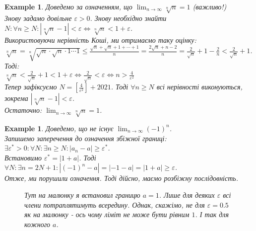\documentclass[a4paper, 14pt]{article}
\theoremstyle{theoremdd}
\theoremstyle{theoremdd}
\theoremstyle{theoremdd}
\theoremstyle{theoremdd}
\newtheorem{example}[theorem]{Example}
\theoremstyle{theoremdd}
\theoremstyle{theoremdd}
\theoremstyle{theoremdd}
\theoremstyle{theoremdd}
\begin{document}
	\begin{example}
	Доведемо за означенням, що $\displaystyle\lim_{n \to \infty} \sqrt[n]{n}=1$ (важливо!)\\
	Знову задамо довільне $\varepsilon > 0$. Знову необхідно знайти $\displaystyle N: \forall n \geq N: \left|\sqrt[n]{n}-1  \right|<\varepsilon \iff \sqrt[n]{n}<1+\varepsilon$.\\
	Використовуючи нерівність Коші, ми отримаємо таку оцінку:\\
	$\displaystyle \sqrt[n]{n}= \sqrt[n]{\sqrt{n}\cdot\sqrt{n}\cdot 1 \cdots 1} \leq \frac{\sqrt{n}+\sqrt{n}+1+\cdots+1}{n} = \frac{2\sqrt{n}+n-2}{n} = \frac{2}{\sqrt{n}}+1-\frac{2}{n}<\frac{2}{\sqrt{n}}+1$. Тоді:\\
	$\displaystyle \sqrt[n]{n} < \frac{2}{\sqrt{n}} + 1 < 1 + \varepsilon \iff \frac{2}{\sqrt{n}} < \varepsilon \iff n > \frac{4}{\varepsilon^2}$\\
	Тепер зафіксуємо $\displaystyle N = \left[\frac{4}{\varepsilon^2} \right] + 2021$. Тоді $\forall n \geq N$ всі нерівності виконуються, зокрема $\left|\sqrt[n]{n}-1  \right|<\varepsilon$.\\
	Остаточно: $\displaystyle\lim_{n \to \infty} \sqrt[n]{n}=1$.
	\end{example}
	
	\begin{example}
	Доведемо, що не існує $\displaystyle \lim_{n \to \infty} (-1)^n$.\\
	Запишемо заперечення до означення збіжної границі:\\
	$\exists \varepsilon^* > 0: \forall N: \exists n \geq N: |a_n - a| \geq \varepsilon^*$.\\
	Встановимо $\varepsilon^* = |1+a|$. Тоді $\forall N: \exists n = 2N+1 : |(-1)^n - a|= |-1-a| = |1+a| \geq \varepsilon$.\\
	Отже, ми порушили означення. Тоді дійсно, маємо розбіжну послідовність.
\begin{figure}[H]
\centering
\resizebox{0.5\textwidth}{!} {
}
\caption*{Тут на малюнку я встановил границю $a=1$. Лише для деяких $\varepsilon$ всі члени потраплятимуть всередину. Однак, скажімо, не для $\varepsilon = 0.5$ як на малюнку - ось чому ліміт не може бути рівним $1$. І так для кожного $a$.}
\end{figure}
	\end{example}
\end{document}
